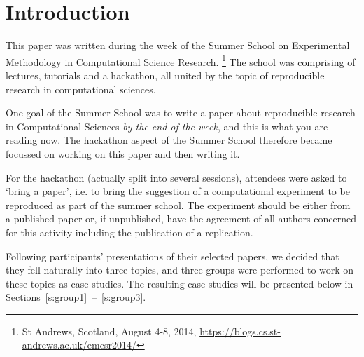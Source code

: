 \section{Introduction}
\label{s:intro}

This paper was written during the week of the Summer School
on Experimental Methodology in Computational Science Research.
\footnote{St Andrews, Scotland, August 4-8, 2014,
\url{https://blogs.cs.st-andrews.ac.uk/emcsr2014/}} The 
school was comprising of lectures, tutorials and a hackathon,
all united by the topic of reproducible research in computational
sciences. 

One goal of the Summer School was to write a paper about reproducible research in
Computational Sciences \emph{by the end of the week}, and this is what you are reading now.
The hackathon aspect of the Summer School therefore became focussed on working on this paper
and then writing it. 

For the hackathon (actually split into several sessions), attendees 
were asked to `bring a paper', i.e. to bring the suggestion of a 
computational experiment to be reproduced as part of the summer school. 
The experiment should be either from a published paper or, if unpublished, 
have the agreement of all authors concerned for this activity including 
the publication of a replication.  

Following participants' presentations of their 
selected papers, we decided that they fell naturally into three topics, 
and three groups were performed to work on these topics as case studies.
The resulting case studies will be presented below
in Sections~\ref{s:group1}~--~\ref{s:group3}.



